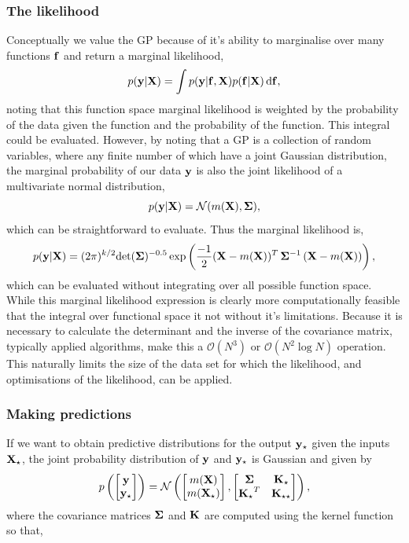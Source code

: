 \subsubsection{The likelihood}
Conceptually we value the GP because of it's ability to marginalise over many functions $\bf f$ and return a marginal likelihood,
\begin{equation}
p({\bf y} | {\bf X}) = \int p({\bf y} | {\bf f}, {\bf X}) p({\bf f} | {\bf X}) \, {\rm d}{\bf f},
\end{equation}
noting that this function space marginal likelihood is weighted by the probability of the data given the function and the probability of the function.  This integral could be evaluated.  However, by noting that a GP is a collection of random variables, where any finite number of which have a joint Gaussian distribution, the marginal probability of our data $\bf y$ is also the joint likelihood of a multivariate normal distribution,
\begin{equation}
p({\bf y} | {\bf X}) = \mathcal{N}(m({\bf X}), {\bf \Sigma}),
\end{equation}
which can be straightforward to evaluate. Thus the marginal likelihood is,
\begin{equation}
p({\bf y} | {\bf X}) = (2 \pi)^{k/2} {\rm det} ({\bf \Sigma})^{-0.5} \exp \left(\frac{-1}{2} ({\bf X} - m({\bf X}))^{T} \, {\bf \Sigma}^{-1} \, ({\bf X} - m({\bf X})) \right),
\end{equation}
which can be evaluated without integrating over all possible function space. While this marginal likelihood expression is clearly more computationally feasible that the integral over functional space it not without it's limitations.  Because it is necessary to calculate the determinant and the inverse of the covariance matrix, typically applied algorithms,  make this a $\mathcal{O}(N^3)$ or $\mathcal{O}(N^2 \log N)$ operation.  This naturally limits the size of the data set for which the likelihood,  and optimisations of the likelihood, can be applied.  

\subsubsection{Making predictions}
If we want to obtain predictive distributions for the output $\bf y_{\star}$ given the inputs $\bf X_{\star}$,  the joint probability distribution of $\bf y$ and $\bf y_{\star}$ is Gaussian and given by
\begin{equation}
p \left( \begin{bmatrix} {\bf y} \\ {\bf y_{\star}} \end{bmatrix} \right) = \mathcal{N} \left( \begin{bmatrix} m({\bf X}) \\ m({\bf X_{\star}}) \end{bmatrix} , \begin{bmatrix} {\bf \Sigma} & {\bf K_{\star} }\\ {\bf K_{\star}}^{T} & {\bf K_{\star \star}} \end{bmatrix}  \right), 
\end{equation}
where the covariance matrices $\bf \Sigma$ and $\bf K$ are computed using the kernel function so that,

